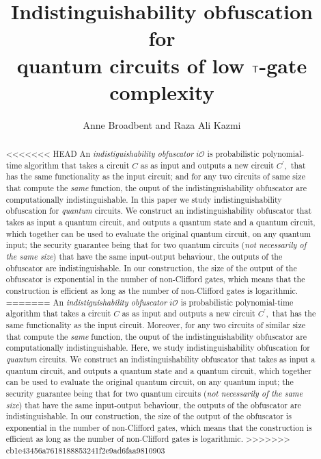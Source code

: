 \documentclass[english,11pt]{article}
\title{Indistinguishability obfuscation \\for\\ quantum circuits of low ${\sf T}$-gate complexity}
\author{Anne Broadbent and Raza Ali Kazmi}
\affil{University of Ottawa, Department of Mathematics and Statistics,\\\texttt{\{abroadbe,rkazmi\}@uottawa.ca.}}
\date{} %
\begin{document}
\maketitle

\begin{abstract}
<<<<<<< HEAD
An \emph{indistiguishability obfuscator} $i\mathcal{O}$ is probabilistic polynomial-time algorithm that takes a circuit $C$ as as input  
and outputs a new circuit $C^\prime,$ that has the same functionality as the input circuit; and for any two circuits of same size that compute the \emph{same} function, the ouput of the indistinguishability obfuscator are computationally indistinguishable. In this paper we study indistinguishability obfuscation for \emph{quantum} circuits. We construct an indistinguishability  obfuscator that takes as input a quantum circuit, and outputs a quantum state and a quantum circuit, which together can be used to evaluate the original quantum circuit, on any quantum input; the security guarantee being that for two quantum circuits ({\em not necessarily of the same size}) that have the same input-output behaviour, the outputs of the obfuscator are indistinguishable. In our construction, the size of the output of the obfuscator is exponential in the number of non-Clifford gates, which means that the construction is efficient as long as the number of non-Clifford gates is logarithmic. 
=======
An \emph{indistiguishability obfuscator} $i\mathcal{O}$ is probabilistic polynomial-time algorithm that takes a circuit $C$ as as input%
and outputs a new circuit $C^\prime,$ that has the same functionality as the input circuit. Moreover, for any two circuits of similar size that compute the \emph{same} function, the ouput of the indistinguishability obfuscator are computationally indistinguishable. Here, we study indistinguishability obfuscation for \emph{quantum} circuits. We construct an indistinguishability  obfuscator that takes as input a quantum circuit, and outputs a quantum state and a quantum circuit, which together can be used to evaluate the original quantum circuit, on any quantum input; the security guarantee being that for two quantum circuits ({\em not necessarily of the same size}) that have the same input-output behaviour, the outputs of the obfuscator are indistinguishable. In our construction, the size of the output of the obfuscator is exponential in the number of non-Clifford gates, which means that the construction is efficient as long as the number of non-Clifford gates is logarithmic. 
>>>>>>> cb1e43456a7618188853241f2e9ad6faa9810903
\end{abstract}
\end{document}

